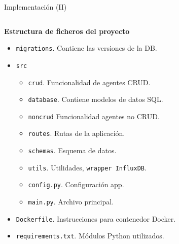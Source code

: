 \documentclass[aspectratio=169,xcolor=dvipsnames]{beamer}
\begin{document}
	\begin{frame}{Implementación (II)}
		\begin{columns}
			\begin{column}{0.6\textwidth}
				\textbf{Estructura de ficheros del proyecto}
				
				\begin{itemize}
					\item \texttt{migrations}. Contiene las versiones de la DB.
					
					\item \texttt{src}
					
					\begin{itemize}
						\item \texttt{crud}. Funcionalidad de agentes CRUD.
						
						\item \texttt{database}. Contiene modelos de datos SQL.
						
						\item \texttt{noncrud} Funcionalidad agentes no CRUD.
						
						\item \texttt{routes}. Rutas de la aplicación.
						
						\item \texttt{schemas}. Esquema de datos.
						
						\item \texttt{utils}. Utilidades, \texttt{wrapper InfluxDB}.
						
						\item \texttt{config.py}. Configuración app.
						
						\item \texttt{main.py}. Archivo principal.
					\end{itemize}
				
					\item \texttt{Dockerfile}. Instrucciones para contenedor Docker.
					
					\item \texttt{requirements.txt}. Módulos Python utilizados.
				\end{itemize}
			\end{column}
		

\end{columns}
\end{frame}
\end{document}
